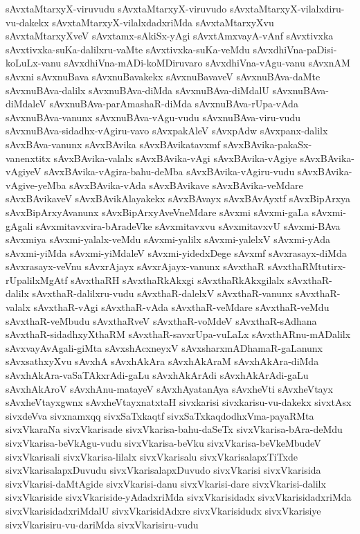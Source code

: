 {sAvxtaMtarxyX-viruvudu
sAvxtaMtarxyX-viruvudo
sAvxtaMtarxyX-vilalxdiru-vu-dakekx
sAvxtaMtarxyX-vilalxdadxriMda
sAvxtaMtarxyXvu
sAvxtaMtarxyXveV
sAvxtamx-sAkiSx-yAgi
sAvxtAmxvayA-vAnf
sAvxtivxka
sAvxtivxka-suKa-dalilxru-vaMte
sAvxtivxka-suKa-veMdu
sAvxdhiVna-paDisi-koLuLx-vanu
sAvxdhiVna-mADi-koMDiruvaro
sAvxdhiVna-vAgu-vanu
sAvxnAM
sAvxni
sAvxnuBava
sAvxnuBavakekx
sAvxnuBavaveV
sAvxnuBAva-daMte
sAvxnuBAva-dalilx
sAvxnuBAva-diMda
sAvxnuBAva-diMdalU
sAvxnuBAva-diMdaleV
sAvxnuBAva-parAmashaR-diMda
sAvxnuBAva-rUpa-vAda
sAvxnuBAva-vanunx
sAvxnuBAva-vAgu-vudu
sAvxnuBAva-viru-vudu
sAvxnuBAva-sidadhx-vAgiru-vavo
sAvxpakAleV
sAvxpAdw
sAvxpanx-dalilx
sAvxBAva-vanunx
sAvxBAvika
sAvxBAvikatavxmf
sAvxBAvika-pakaSx-vanenxtitx
sAvxBAvika-valalx
sAvxBAvika-vAgi
sAvxBAvika-vAgiye
sAvxBAvika-vAgiyeV
sAvxBAvika-vAgira-bahu-deMba
sAvxBAvika-vAgiru-vudu
sAvxBAvika-vAgive-yeMba
sAvxBAvika-vAda
sAvxBAvikave
sAvxBAvika-veMdare
sAvxBAvikaveV
sAvxBAvikAlayakekx
sAvxBAvayx
sAvxBAvAyxtf
sAvxBipArxya
sAvxBipArxyAvanunx
sAvxBipArxyAveVneMdare
sAvxmi
sAvxmi-gaLa
sAvxmi-gAgali
sAvxmitavxvira-bAradeVke
sAvxmitavxvu
sAvxmitavxvU
sAvxmi-BAva
sAvxmiya
sAvxmi-yalalx-veMdu
sAvxmi-yalilx
sAvxmi-yalelxV
sAvxmi-yAda
sAvxmi-yiMda
sAvxmi-yiMdaleV
sAvxmi-yidedxDege
sAvxmf
sAvxrasayx-diMda
sAvxrasayx-veVnu
sAvxrAjayx
sAvxrAjayx-vanunx
sAvxthaR
sAvxthaRMtutirx-rUpalilxMgAtf
sAvxthaRH
sAvxthaRkAkxgi
sAvxthaRkAkxgilalx
sAvxthaR-dalilx
sAvxthaR-dalilxru-vudu
sAvxthaR-dalelxV
sAvxthaR-vanunx
sAvxthaR-valalx
sAvxthaR-vAgi
sAvxthaR-vAda
sAvxthaR-veMdare
sAvxthaR-veMdu
sAvxthaR-veMbudu
sAvxthaRveV
sAvxthaR-voMdeV
sAvxthaR-sAdhana
sAvxthaR-sidadhxyXthaRM
sAvxthaR-savxrUpa-vuLaLx
sAvxthARnu-mADalilx
sAvxvayAvAgali-giMta
sAvxshAcxneyxV
sAvxsharxmADhamaR-gaLanunx
sAvxsathxyXvu
sAvxhA
sAvxhAkAra
sAvxhAkAraM
sAvxhAkAra-diMda
sAvxhAkAra-vaSaTAkxrAdi-gaLu
sAvxhAkArAdi
sAvxhAkArAdi-gaLu
sAvxhAkAroV
sAvxhAnu-matayeV
sAvxhAyatanAya
sAvxheVti
sAvxheVtayx
sAvxheVtayxgwnx
sAvxheVtayxnatxtaH
sivxkarisi
sivxkarisu-vu-dakekx
sivxtAsx
sivxdeVva
sivxnamxqq
sivxSaTxkaqtf
sivxSaTxkaqdodhxVma-payaRMta
sivxVkaraNa
sivxVkarisade
sivxVkarisa-bahu-daSeTx
sivxVkarisa-bAra-deMdu
sivxVkarisa-beVkAgu-vudu
sivxVkarisa-beVku
sivxVkarisa-beVkeMbudeV
sivxVkarisali
sivxVkarisa-lilalx
sivxVkarisalu
sivxVkarisalapxTiTxde
sivxVkarisalapxDuvudu
sivxVkarisalapxDuvudo
sivxVkarisi
sivxVkarisida
sivxVkarisi-daMtAgide
sivxVkarisi-danu
sivxVkarisi-dare
sivxVkarisi-dalilx
sivxVkariside
sivxVkariside-yAdadxriMda
sivxVkarisidadx
sivxVkarisidadxriMda
sivxVkarisidadxriMdalU
sivxVkarisidAdxre
sivxVkarisidudx
sivxVkarisiye
sivxVkarisiru-vu-dariMda
sivxVkarisiru-vudu
}
